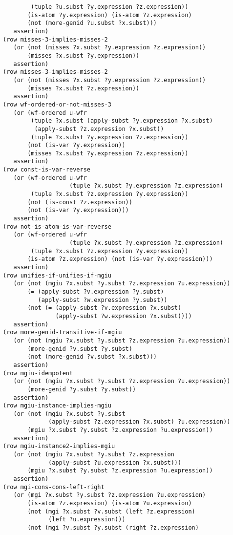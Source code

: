 \documentclass[runningheads]{llncs}
\begin{document}
\begin{verbatim}
        (tuple ?u.subst ?y.expression ?z.expression))
       (is-atom ?y.expression) (is-atom ?z.expression)
       (not (more-genid ?u.subst ?x.subst)))
   assertion)
(row misses-3-implies-misses-2
   (or (not (misses ?x.subst ?y.expression ?z.expression))
       (misses ?x.subst ?y.expression))
   assertion)
(row misses-3-implies-misses-2
   (or (not (misses ?x.subst ?y.expression ?z.expression))
       (misses ?x.subst ?z.expression))
   assertion)
(row wf-ordered-or-not-misses-3
   (or (wf-ordered u-wfr
        (tuple ?x.subst (apply-subst ?y.expression ?x.subst)
         (apply-subst ?z.expression ?x.subst))
        (tuple ?x.subst ?y.expression ?z.expression))
       (not (is-var ?y.expression))
       (misses ?x.subst ?y.expression ?z.expression))
   assertion)
(row const-is-var-reverse
   (or (wf-ordered u-wfr 
                   (tuple ?x.subst ?y.expression ?z.expression)
        (tuple ?x.subst ?z.expression ?y.expression))
       (not (is-const ?z.expression)) 
       (not (is-var ?y.expression)))
   assertion)
(row not-is-atom-is-var-reverse
   (or (wf-ordered u-wfr 
                   (tuple ?x.subst ?y.expression ?z.expression)
        (tuple ?x.subst ?z.expression ?y.expression))
       (is-atom ?z.expression) (not (is-var ?y.expression)))
   assertion)
(row unifies-if-unifies-if-mgiu
   (or (not (mgiu ?x.subst ?y.subst ?z.expression ?u.expression))
       (= (apply-subst ?v.expression ?y.subst)
          (apply-subst ?w.expression ?y.subst))
       (not (= (apply-subst ?v.expression ?x.subst)
               (apply-subst ?w.expression ?x.subst))))
   assertion)
(row more-genid-transitive-if-mgiu
   (or (not (mgiu ?x.subst ?y.subst ?z.expression ?u.expression))
       (more-genid ?v.subst ?y.subst)
       (not (more-genid ?v.subst ?x.subst)))
   assertion)
(row mgiu-idempotent
   (or (not (mgiu ?x.subst ?y.subst ?z.expression ?u.expression))
       (more-genid ?y.subst ?y.subst))
   assertion)
(row mgiu-instance-implies-mgiu
   (or (not (mgiu ?x.subst ?y.subst
             (apply-subst ?z.expression ?x.subst) ?u.expression))
       (mgiu ?x.subst ?y.subst ?z.expression ?u.expression))
   assertion)
(row mgiu-instance2-implies-mgiu
   (or (not (mgiu ?x.subst ?y.subst ?z.expression
             (apply-subst ?u.expression ?x.subst)))
       (mgiu ?x.subst ?y.subst ?z.expression ?u.expression))
   assertion)
(row mgi-cons-cons-left-right
   (or (mgi ?x.subst ?y.subst ?z.expression ?u.expression)
       (is-atom ?z.expression) (is-atom ?u.expression)
       (not (mgi ?x.subst ?v.subst (left ?z.expression)
             (left ?u.expression)))
       (not (mgi ?v.subst ?y.subst (right ?z.expression)

\end{verbatim}
\end{document}
